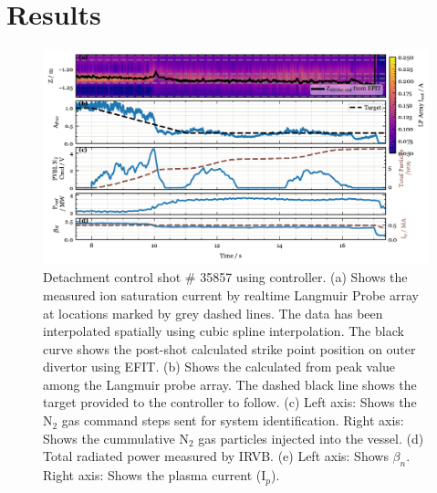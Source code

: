 \section{Results}
\label{sec:results}

\begin{figure}[!ht]
 \centering
 \includegraphics[width=\textwidth]{figures/DetCtrl_2D_35857.pdf}
 \caption{
Detachment control shot \# 35857 using \Afrac controller.
(a) Shows the measured ion saturation current by realtime Langmuir Probe array at locations marked by grey dashed lines.
The data has been interpolated spatially using cubic spline interpolation.
The black curve shows the post-shot calculated strike point position on outer divertor using EFIT.
(b) Shows the \Afrac calculated from peak value among the Langmuir probe array.
The dashed black line shows the target provided to the controller to follow.
(c) Left axis: Shows the N$_2$ gas command steps sent for system identification.
Right axis: Shows the cummulative N$_2$ gas particles injected into the vessel.
(d) Total radiated power measured by \ac{IRVB}.
(e) Left axis: Shows $\beta_n$.
Right axis: Shows the plasma current (I$_p$).
}
 \label{fig:detctrl_afrac}
\end{figure}


